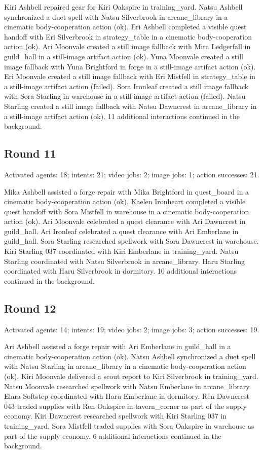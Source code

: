 \documentclass[11pt,a4paper]{article}
\begin{document}
Kiri Ashbell repaired gear for Kiri Oakspire in training\_yard. Natsu Ashbell synchronized a duet spell with Natsu Silverbrook in arcane\_library in a cinematic body-cooperation action (ok). Eri Ashbell completed a visible quest handoff with Eri Silverbrook in strategy\_table in a cinematic body-cooperation action (ok). Ari Moonvale created a still image fallback with Mira Ledgerfall in guild\_hall in a still-image artifact action (ok). Yuna Moonvale created a still image fallback with Yuna Brightford in forge in a still-image artifact action (ok). Eri Moonvale created a still image fallback with Eri Mistfell in strategy\_table in a still-image artifact action (failed). Sora Ironleaf created a still image fallback with Sora Starling in warehouse in a still-image artifact action (failed). Natsu Starling created a still image fallback with Natsu Dawncrest in arcane\_library in a still-image artifact action (ok). 11 additional interactions continued in the background.

\subsection{Round 11}
Activated agents: 18; intents: 21; video jobs: 2; image jobs: 1; action successes: 21.

Mika Ashbell assisted a forge repair with Mika Brightford in quest\_board in a cinematic body-cooperation action (ok). Kaelen Ironheart completed a visible quest handoff with Sora Mistfell in warehouse in a cinematic body-cooperation action (ok). Ari Moonvale celebrated a quest clearance with Ari Dawncrest in guild\_hall. Ari Ironleaf celebrated a quest clearance with Ari Emberlane in guild\_hall. Sora Starling researched spellwork with Sora Dawncrest in warehouse. Kiri Starling 037 coordinated with Kiri Emberlane in training\_yard. Natsu Starling coordinated with Natsu Silverbrook in arcane\_library. Haru Starling coordinated with Haru Silverbrook in dormitory. 10 additional interactions continued in the background.

\subsection{Round 12}
Activated agents: 14; intents: 19; video jobs: 2; image jobs: 3; action successes: 19.

Ari Ashbell assisted a forge repair with Ari Emberlane in guild\_hall in a cinematic body-cooperation action (ok). Natsu Ashbell synchronized a duet spell with Natsu Starling in arcane\_library in a cinematic body-cooperation action (ok). Kiri Moonvale delivered a scout report to Kiri Silverbrook in training\_yard. Natsu Moonvale researched spellwork with Natsu Emberlane in arcane\_library. Elara Softstep coordinated with Haru Emberlane in dormitory. Ren Dawncrest 043 traded supplies with Ren Oakspire in tavern\_corner as part of the supply economy. Kiri Dawncrest researched spellwork with Kiri Starling 037 in training\_yard. Sora Mistfell traded supplies with Sora Oakspire in warehouse as part of the supply economy. 6 additional interactions continued in the background.
\end{document}
